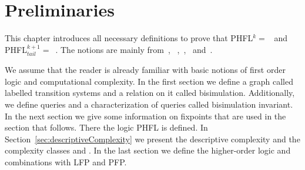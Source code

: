 \chapter{Preliminaries}
\label{ch:preliminaries}
This chapter introduces all necessary definitions to prove that PHFL$^k =$~ and
PHFL$^{k+1}_{tail} =$~. The notions are mainly from~\cite{immerman1999descriptive},
~\cite{papadimitriou1994complexity},~\cite{otto1999bisimulation},~\cite{freireMartins2011descriptive}
and~\cite{lange2014capturing}.

We assume that the reader is already familiar with basic notions of first order logic and 
computational complexity. In the first section we define a graph called labelled transition systems and 
a relation on it called bisimulation. Additionally, we define queries and a characterization of queries called bisimulation invariant. 
In the next section we give some information on fixpoints that are used in the section that follows. 
There the logic PHFL is defined. In Section~\ref{sec:descriptiveComplexity} we present the 
descriptive complexity and the complexity classes  and . In the last section we define the higher-order logic and combinations with LFP and PFP.










